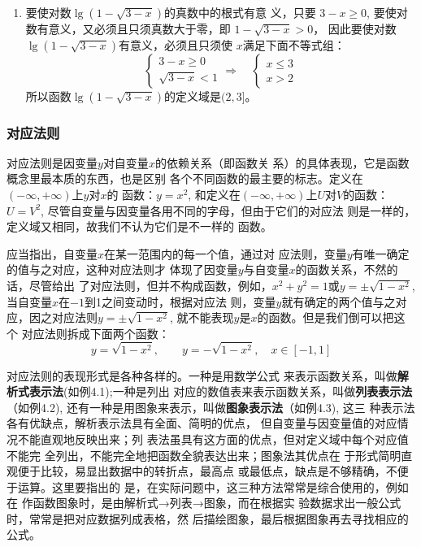 \begin{solution}
\begin{enumerate}
\item 要使对数$\lg(1-\sqrt{3-x})$的真数中的根式有意
义，只要
$3-x\ge 0$, 
要使对数有意义，又必须且只须真数大于零，即
$1-\sqrt{3-x}>0$，
因此要使对数$\lg(1-\sqrt{3-x})$有意义，必须且只须使
$x$满足下面不等式组：
\[\begin{cases}
    3-x\ge 0\\
\sqrt{3-x}<1
\end{cases}\Rightarrow\quad \begin{cases}
    x\le 3\\
x>2
\end{cases}\]
所以函数$\lg(1-\sqrt{3-x})$的定义域是$(2,3]$。 

\end{enumerate}    
\end{solution}

\subsubsection{对应法则}
对应法则是因变量$y$对自变量$x$的依赖关系（即函数关
系）的具体表现，它是函数概念里最本质的东西，也是区别
各个不同函数的最主要的标志。定义在$(-\infty,+\infty)$上$y$对$x$的
函数：$y=x^2$, 和定义在$(-\infty,+\infty)$上$U$对$V$的函数：$U=V^2$, 
尽管自变量与因变量各用不同的字母，但由于它们的对应法
则是一样的，定义域又相同，故我们不认为它们是不一样的
函数。

应当指出，自变量$x$在某一范围内的每一个值，通过对
应法则，变量$y$有唯一确定的值与之对应，这种对应法则才
体现了因变量$y$与自变量$x$的函数关系，不然的话，尽管给出
了对应法则，但并不构成函数，例如，$x^2+y^2=1$或$y=
\pm\sqrt{1-x^2}$, 当自变量$x$在$-1$到1之间变动时，根据对应法
则，变量$y$就有确定的两个值与之对应，因之对应法则$y=
\pm\sqrt{1-x^2}$, 就不能表现$y$是$x$的函数。但是我们倒可以把这个
对应法则拆成下面两个函数：
\[y=\sqrt{1-x^2},\qquad y=-\sqrt{1-x^2},\quad x\in [-1,1]\]

对应法则的表现形式是各种各样的。一种是用数学公式
来表示函数关系，叫做\textbf{解析式表示法}(如例4.1);一种是列出
对应的数值表来表示函数关系，叫做\textbf{列表表示法}（如例4.2),
还有一种是用图象来表示，叫做\textbf{图象表示法}（如例4.3), 这三
种表示法各有优缺点，解析表示法具有全面、简明的优点，
但自变量与因变量值的对应情况不能直观地反映出来；列
表法虽具有这方面的优点，但对定义域中每个对应值不能完
全列出，不能完全地把函数全貌表达出来；图象法其优点在
于形式简明直观便于比较，易显出数据中的转折点，最高点
或最低点，缺点是不够精确，不便于运算。这里要指出的
是，在实际问题中，这三种方法常常是综合使用的，例如在
作函数图象时，是由解析式→列表→图象，而在根据实
验数据求出一般公式时，常常是把对应数据列成表格，然
后描绘图象，最后根据图象再去寻找相应的公式。

